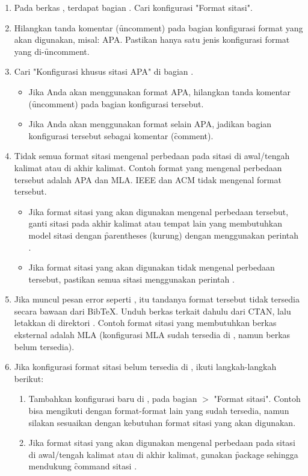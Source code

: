 \begin{enumerate}
	\item Pada berkas , terdapat bagian . Cari konfigurasi "Format sitasi".
	\item Hilangkan tanda komentar (\f{uncomment}) pada bagian konfigurasi format yang akan digunakan, misal: APA. Pastikan hanya satu jenis konfigurasi format yang di-\f{uncomment}.
	\item Cari "Konfigurasi khusus sitasi APA" di bagian .
	\begin{itemize}
		\item Jika Anda akan menggunakan format APA, hilangkan tanda komentar (\f{uncomment}) pada bagian konfigurasi tersebut.
		\item Jika Anda akan menggunakan format selain APA, jadikan bagian konfigurasi tersebut sebagai komentar (\f{comment}).
	\end{itemize}
	\item Tidak semua format sitasi mengenal perbedaan pada sitasi di awal/tengah kalimat atau di akhir kalimat. Contoh format yang mengenal perbedaan tersebut adalah APA dan MLA. IEEE dan ACM tidak mengenal format tersebut.
	\begin{itemize}
		\item Jika format sitasi yang akan digunakan mengenal perbedaan tersebut, ganti sitasi pada akhir kalimat atau tempat lain yang membutuhkan model sitasi dengan \f{parentheses} (kurung) dengan menggunakan perintah .
		\item Jika format sitasi yang akan digunakan tidak mengenal perbedaan tersebut, pastikan semua sitasi menggunakan perintah .
	\end{itemize}
	\item Jika muncul pesan error seperti , itu tandanya format tersebut tidak tersedia secara bawaan dari BibTeX. Unduh berkas terkait dahulu dari CTAN, lalu letakkan di direktori . Contoh format sitasi yang membutuhkan berkas eksternal adalah MLA (konfigurasi MLA sudah tersedia di , namun berkas  belum tersedia).
	\item Jika konfigurasi format sitasi belum tersedia di , ikuti langkah-langkah berikut:
	\begin{enumerate}
		\item Tambahkan konfigurasi baru di , pada bagian  $>$ "Format sitasi". Contoh bisa mengikuti dengan format-format lain yang sudah tersedia, namun silakan sesuaikan dengan kebutuhan format sitasi yang akan digunakan.
		\item Jika format sitasi yang akan digunakan mengenal perbedaan pada sitasi di awal/tengah kalimat atau di akhir kalimat, gunakan \f{package}  sehingga mendukung \f{command} sitasi .
	\end{enumerate}
\end{enumerate}


